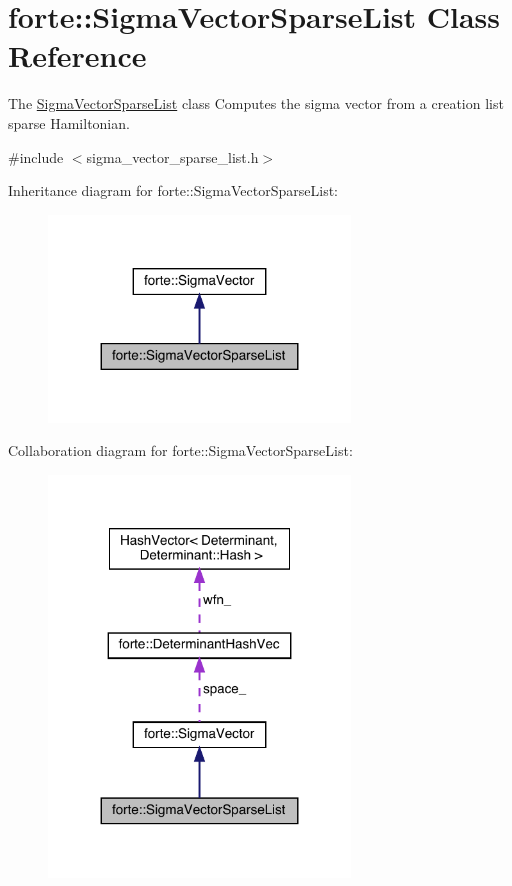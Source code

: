 \hypertarget{classforte_1_1_sigma_vector_sparse_list}{}\section{forte\+:\+:Sigma\+Vector\+Sparse\+List Class Reference}
\label{classforte_1_1_sigma_vector_sparse_list}


The \mbox{\hyperlink{classforte_1_1_sigma_vector_sparse_list}{Sigma\+Vector\+Sparse\+List}} class Computes the sigma vector from a creation list sparse Hamiltonian.  




{\ttfamily \#include $<$sigma\+\_\+vector\+\_\+sparse\+\_\+list.\+h$>$}



Inheritance diagram for forte\+:\+:Sigma\+Vector\+Sparse\+List\+:
\nopagebreak
\begin{figure}[H]
\begin{center}
\leavevmode
\includegraphics[width=227pt]{classforte_1_1_sigma_vector_sparse_list__inherit__graph}
\end{center}
\end{figure}


Collaboration diagram for forte\+:\+:Sigma\+Vector\+Sparse\+List\+:
\nopagebreak
\begin{figure}[H]
\begin{center}
\leavevmode
\includegraphics[width=227pt]{classforte_1_1_sigma_vector_sparse_list__coll__graph}
\end{center}
\end{figure}
